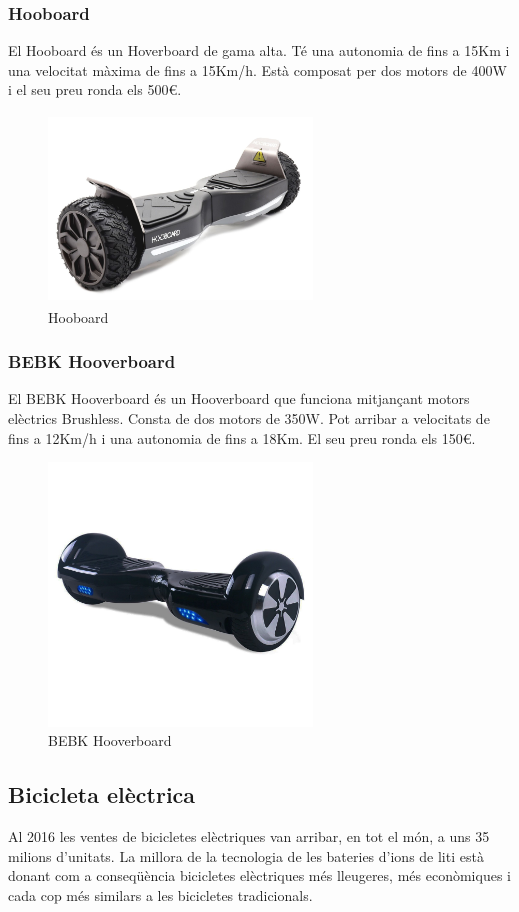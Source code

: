 \subsubsection{Hooboard} 
El Hooboard és un Hoverboard de gama alta. Té una autonomia de fins a 15Km i una velocitat màxima de fins a 15Km/h. Està composat per dos motors de 400W i el seu preu ronda els 500€.
\begin{figure}[H]
		\centering
    	\includegraphics[width=7cm, height=5cm]{Marcteoric/hooboard.jpg}
     	\caption{Hooboard}
\end{figure}


\subsubsection{BEBK Hooverboard} 
El BEBK Hooverboard és un Hooverboard que funciona mitjançant motors elèctrics Brushless. Consta de dos motors de 350W. Pot arribar a velocitats de fins a 12Km/h i una autonomia de fins a 18Km. El seu preu ronda els 150€.
\begin{figure}[H]
		\centering
    	\includegraphics[width=7cm, height=7cm]{Marcteoric/bebkhooverboard.jpg}
     	\caption{BEBK Hooverboard}
\end{figure}

\subsection{Bicicleta elèctrica}
Al 2016 les ventes de bicicletes elèctriques van arribar, en tot el món, a uns 35 milions d'unitats. La millora de la tecnologia de les bateries d'ions de liti està donant com a conseqüència bicicletes elèctriques més lleugeres, més econòmiques i cada cop més similars a les bicicletes tradicionals.

